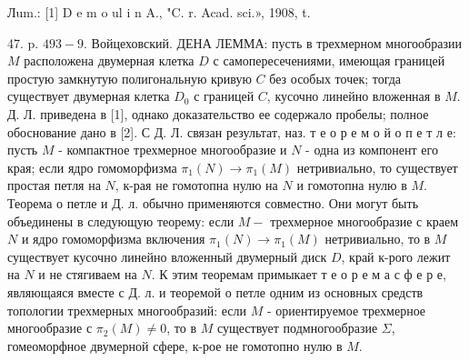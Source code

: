 \documentclass[10pt]{article}
\begin{document}
Лum.: [1] D e m o ul i n A., "C. r. Acad. sci.», 1908, t.

47. p. $493-9$. Войцеховский. ДЕНА ЛЕММА: пусть в трехмерном многообразии $M$ расположена двумерная клетка $D$ с самопересечениями, имеющая границей простую замкнутую полигональную кривую $C$ без особых точек; тогда существует двумерная клетка $D_{0}$ с границей $C$, кусочно линейно вложенная в $M$. Д. Л. приведена в [1], однако доказательство ее содержало пробелы; полное обоснование дано в [2]. С Д. Л. связан результат, наз. т е о р е м о й о п е т л е: пусть $M$ - компактное трехмерное многообразие и $N$ - одна из компонент его края; если ядро гомоморфизма $\pi_{1}(N) \rightarrow \pi_{1}(M)$ нетривиально, то существует простая петля на $N$, к-рая не гомотопна нулю на $N$ и гомотопна нулю в $M$. Теорема о петле и Д. л. обычно применяются совместно. Они могут быть объединены в следующую теорему: если $M-$ трехмерное многообразие с краем $N$ и ядро гомоморфизма включения $\pi_{1}(N) \rightarrow \pi_{1}(M)$ нетривиально, то в $M$ существует кусочно линейно вложенный двумерный диск $D$, край к-рого лежит на $N$ и не стягиваем на $N$. К этим теоремам примыкает т е о р е м а с ф е р е, являющаяся вместе с Д. л. и теоремой о петле одним из основных средств топологии трехмерных многообразий: если $M$ - ориентируемое трехмерное многообразие с $\pi_{2}(M) \neq 0$, то в $M$ существует подмногообразие $\Sigma$, гомеоморфное двумерной сфере, к-рое не гомотопно нулю в $M$.
\end{document}
